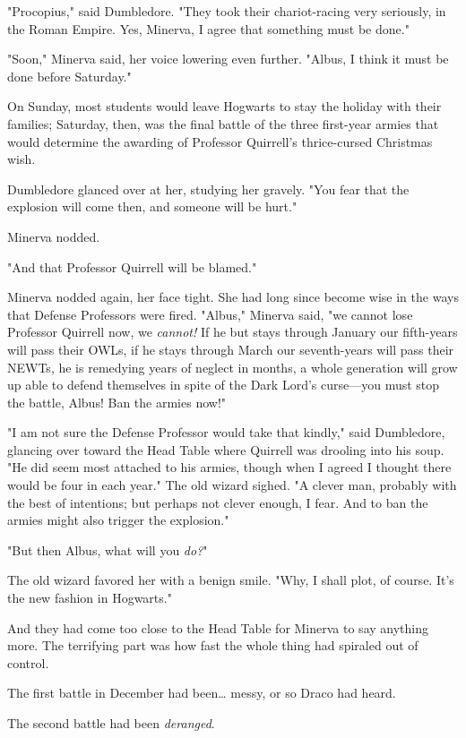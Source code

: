 "Procopius," said Dumbledore. "They took their chariot-racing very seriously, 
in the Roman Empire. Yes, Minerva, I agree that something must be done."

"Soon," Minerva said, her voice lowering even further. "Albus, I think it must 
be done before Saturday."

On Sunday, most students would leave Hogwarts to stay the holiday with their 
families; Saturday, then, was the final battle of the three first-year armies 
that would determine the awarding of Professor Quirrell's thrice-cursed 
Christmas wish.

Dumbledore glanced over at her, studying her gravely. "You fear that the 
explosion will come then, and someone will be hurt."

Minerva nodded.

"And that Professor Quirrell will be blamed."

Minerva nodded again, her face tight. She had long since become wise in the 
ways that Defense Professors were fired. "Albus," Minerva said, "we cannot lose 
Professor Quirrell now, we \emph{cannot!} If he but stays through January our 
fifth-years will pass their OWLs, if he stays through March our seventh-years 
will pass their NEWTs, he is remedying years of neglect in months, a whole 
generation will grow up able to defend themselves in spite of the Dark Lord's 
curse---you must stop the battle, Albus! Ban the armies now!"

"I am not sure the Defense Professor would take that kindly," said Dumbledore, 
glancing over toward the Head Table where Quirrell was drooling into his soup. 
"He did seem most attached to his armies, though when I agreed I thought there 
would be four in each year." The old wizard sighed. "A clever man, probably 
with the best of intentions; but perhaps not clever enough, I fear. And to ban 
the armies might also trigger the explosion."

"But then Albus, what will you \emph{do?}"

The old wizard favored her with a benign smile. "Why, I shall plot, of course. 
It's the new fashion in Hogwarts."

And they had come too close to the Head Table for Minerva to say anything more.
\sbreak
The terrifying part was how fast the whole thing had spiraled out of control.

The first battle in December had been{\ldots} messy, or so Draco had heard.

The second battle had been \emph{deranged}.

